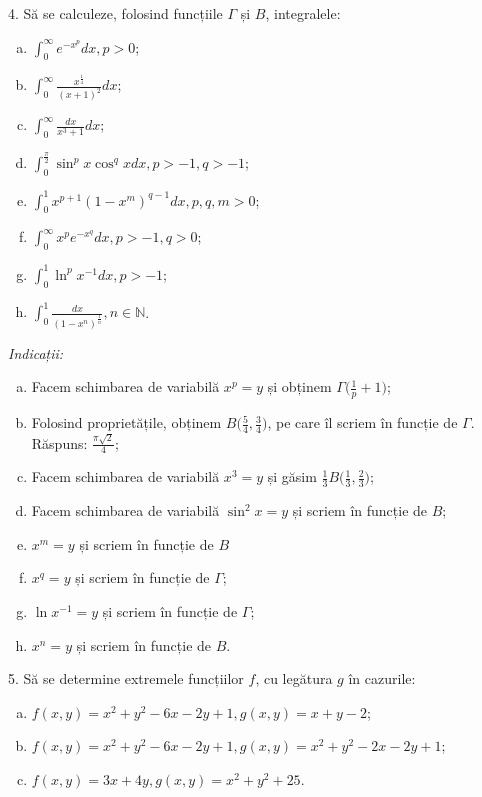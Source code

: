 \documentclass[11pt,a4paper]{article}
\newcommand\ds{\displaystyle}
\newcommand\NN{\mathbb{N}}
\theoremstyle{dotless}
\theoremstyle{dotlessdr}
\begin{document}
\vspace{1cm}

4. Să se calculeze, folosind funcțiile $\Gamma$ și $B$, integralele:
\begin{enumerate}[(a)]
\item $\ds\int_0^\infty e^{-x^p} dx, p > 0$;
\item $\ds\int_0^{\infty} \frac{x^{\frac{1}{4}}}{(x + 1)^2} dx$;
\item $\ds\int_0^\infty \frac{dx}{x^3 + 1} dx$;
\item $\ds\int_0^{\frac{\pi}{2}} \sin^p x \cos^q x dx, p > -1, q > - 1$;
\item $\ds\int_0^1 x^{p+1}(1-x^m)^{q - 1} dx, p, q, m > 0$;
\item $\ds\int_0^\infty x^p e^{-x^q} dx, p > -1, q > 0$;
\item $\ds\int_0^1 \ln^p x^{-1} dx, p > -1$;
\item $\ds\int_0^1 \frac{dx}{(1 - x^n)^{\frac{1}{n}}}, n \in \NN$.
\end{enumerate}

\emph{Indicații:}
\begin{enumerate}[(a)]
\item Facem schimbarea de variabilă $x^p = y$ și obținem $\Gamma\Big(\frac{1}{p} + 1\Big)$;
\item Folosind proprietățile, obținem $B \Big( \frac{5}{4}, \frac{3}{4} \Big)$, pe care
  îl scriem în funcție de $\Gamma$. Răspuns: $\frac{\pi \sqrt{2}}{4}$;
\item Facem schimbarea de variabilă $x^3 = y$ și găsim
  $\frac{1}{3} B \Big( \frac{1}{3}, \frac{2}{3} \Big)$;
\item Facem schimbarea de variabilă $\sin^2 x = y$ și scriem în funcție de $B$;
\item $x^m = y$ și scriem în funcție de $B$
\item $x^q = y$ și scriem în funcție de $\Gamma$;
\item $\ln x^{-1} = y$ și scriem în funcție de $\Gamma$;
\item $x^n = y$ și scriem în funcție de $B$.
\end{enumerate}

\vspace{1cm}

5. Să se determine extremele funcțiilor $f$, cu legătura $g$ în cazurile:
\begin{enumerate}[(a)]
\item $f(x, y) = x^2 + y^2 - 6x - 2y + 1, g(x, y) = x + y - 2$;
\item $f(x, y) = x^2 + y^2 - 6x - 2y + 1, g(x, y) = x^2 + y^2 - 2x - 2y + 1$;
\item $f(x, y) = 3x + 4y, g(x, y) = x^2 + y^2 + 25$.
\end{enumerate}
\end{document}
